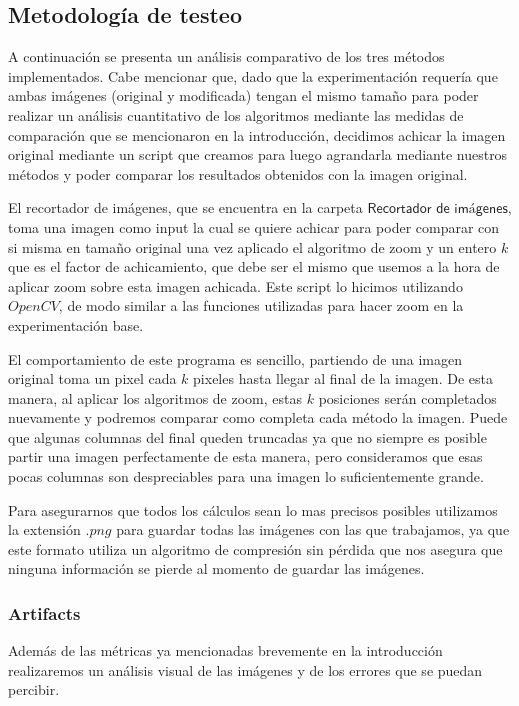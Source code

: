 \subsection{Metodología de testeo}
A continuación se presenta un análisis comparativo de los tres métodos implementados.
Cabe mencionar que, dado que la experimentación requería que ambas imágenes (original y modificada) tengan el mismo tamaño para poder realizar un análisis cuantitativo de los algoritmos mediante las medidas de comparación que se mencionaron en la introducción, decidimos achicar la imagen original mediante un script que creamos para luego agrandarla mediante nuestros métodos y poder comparar los resultados obtenidos con la imagen original.

El recortador de imágenes, que se encuentra en la carpeta $\textsf{Recortador de imágenes}$, toma una imagen como input la cual se quiere achicar para poder comparar con si misma en tamaño original una vez aplicado el algoritmo de zoom y un entero $k$ que es el factor de achicamiento, que debe ser el mismo que usemos a la hora de aplicar zoom sobre esta imagen achicada. Este script lo hicimos utilizando $OpenCV$, de modo similar a las funciones utilizadas para hacer zoom en la experimentación base.

El comportamiento de este programa es sencillo, partiendo de una imagen original toma un pixel cada $k$ pixeles hasta llegar al final de la imagen. De esta manera, al aplicar los algoritmos de zoom, estas $k$ posiciones serán completados nuevamente y podremos comparar como completa cada método la imagen. Puede que algunas columnas del final queden truncadas ya que no siempre es posible partir una imagen perfectamente de esta manera, pero consideramos que esas pocas columnas son despreciables para una imagen lo suficientemente grande. 

Para asegurarnos que todos los cálculos sean lo mas precisos posibles utilizamos la extensión $.png$ para guardar todas las imágenes con las que trabajamos, ya que este formato utiliza un algoritmo de compresión sin pérdida que nos asegura que ninguna información se pierde al momento de guardar las imágenes.

\subsubsection{Artifacts}

Además de las métricas ya mencionadas brevemente en la introducción realizaremos un análisis visual de las imágenes y de los errores que se puedan percibir.

